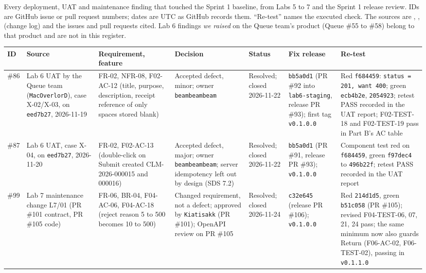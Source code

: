 \label{A:2}

Every deployment, UAT and maintenance finding that touched the Sprint 1 baseline, from Labs 5 to 7 and the Sprint 1 release review. IDs are GitHub issue or pull request numbers; dates are UTC as GitHub records them. ``Re-test'' names the executed check. The sources are , ,  (change log) and the issues and pull requests cited. Lab 6 findings \emph{we raised} on the Queue team's product (Queue \#55 to \#58) belong to that product and are not in this register.

{\footnotesize\setlength{\tabcolsep}{3pt}
\begin{longtable}{@{}p{0.9cm}p{2.6cm}p{2.3cm}p{2.7cm}p{2.0cm}p{1.9cm}p{3.1cm}@{}}
\toprule \textbf{ID} & \textbf{Source} & \textbf{Requirement, feature} & \textbf{Decision} & \textbf{Status} & \textbf{Fix release} & \textbf{Re-test} \\ \midrule \endhead
\#86 & Lab 6 UAT by the Queue team (\texttt{MacOverlorD}), case X-02/X-03, on \texttt{eed7b27}, 2026-11-19 & FR-02, NFR-08, F02-AC-12 (title, purpose, description, receipt reference of only spaces stored blank) & Accepted defect, minor; owner \texttt{beambeambeam} & Resolved; closed 2026-11-22 & \texttt{bb5a0d1} (PR \#92 into \texttt{lab6-}\allowbreak \texttt{staging}, release PR \#93); first tag \texttt{v0.1.0.0} & Red \texttt{f684459}: \texttt{status = 201, want 400}; green \texttt{ecb4b2e}, \texttt{2054923}; retest PASS recorded in the UAT report; F02-TEST-18 and F02-TEST-19 pass in Part B's AC table \\
\#87 & Lab 6 UAT, case X-04, on \texttt{eed7b27}, 2026-11-20 & FR-02, F02-AC-13 (double-click on Submit created CLM-2026-000015 and 000016) & Accepted defect, major; owner \texttt{beambeambeam}; server idempotency left out by design (SDS 7.2) & Resolved; closed 2026-11-22 & \texttt{bb5a0d1} (PR \#91, release PR \#93); \texttt{v0.1.0.0} & Component test red on \texttt{f684459}, green \texttt{f97dec4} to \texttt{496b22f}; retest PASS recorded in the UAT report \\
\#99 & Lab 7 maintenance change L7/01 (PR \#101 contract, PR \#105 code) & FR-06, BR-04, F04-AC-06, F04-AC-18 (reject reason 5 to 500 becomes 10 to 500) & Changed requirement, not a defect; approved by \texttt{Kiatisakk} (PR \#101); OpenAPI review on PR \#105 & Resolved; closed 2026-11-24 & \texttt{c32e645} (release PR \#106); \texttt{v0.1.0.0} & Red \texttt{214d1d5}, green \texttt{b51c058} (PR \#105); revised F04-TEST-06, 07, 21, 24 pass; the same minimum now also guards Return (F06-AC-02, F06-TEST-02), passing in \texttt{v0.1.1.0} \\

\end{longtable}}
